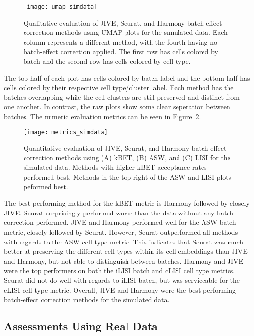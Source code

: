 \documentclass[
12pt, %
letterpaper, %
oneside, %
headinclude,footinclude, %
BCOR5mm, %
]{scrartcl}
\begin{document}
\begin{figure}[H]
    \centering 
    \texttt{[image: umap\_simdata]} 
    \caption[UMAP Plots for Simulated Data]{Qualitative evaluation of JIVE, Seurat, and Harmony batch-effect correction methods using UMAP plots for the simulated data. Each column represents a different method, with the fourth having no batch-effect correction applied. The first row has cells colored by batch and the second row has cells colored by cell type.}
    \label{fig:umap_simdata} 
\end{figure}

The top half of each plot has cells colored by batch label and the bottom half has cells colored by their respective cell type/cluster label. Each method has the batches overlapping while the cell clusters are still preserved and distinct from one another. In contrast, the raw plots show some clear seperation between batches. The numeric evaluation metrics can be seen in Figure~\ref{fig:metrics_simdata}.

\begin{figure}[H]
    \centering 
    \texttt{[image: metrics\_simdata]} 
    \caption[Metrics for Simulated Data]{Quantitative evaluation of JIVE, Seurat, and Harmony batch-effect correction methods using (A) kBET, (B) ASW, and (C) LISI for the simulated data. Methods with higher kBET acceptance rates performed best. Methods in the top right of the ASW and LISI plots peformed best.}
    \label{fig:metrics_simdata} 
\end{figure}

The best performing method for the kBET metric is Harmony followed by closely JIVE. Seurat surprisingly performed worse than the data without any batch correction performed. JIVE and Harmony performed well for the ASW batch metric, closely followed by Seurat. However, Seurat outperformed all methods with regards to the ASW cell type metric. This indicates that Seurat was much better at preserving the different cell types within its cell embeddings than JIVE and Harmony, but not able to distinguish between batches. Harmony and JIVE were the top performers on both the iLISI batch and cLISI cell type metrics. Seurat did not do well with regards to iLISI batch, but was serviceable for the cLISI cell type metric. Overall, JIVE and Harmony were the best performing batch-effect correction methods for the simulated data.


\subsection{Assessments Using Real Data}
\end{document}
